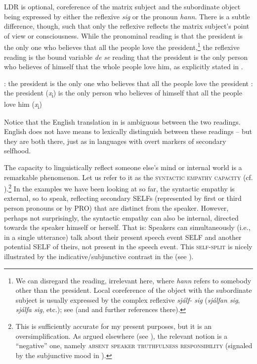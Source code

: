 \documentclass[output=paper]{LSP/langsci}
\begin{document}
LDR is optional, coreference of the matrix subject and the subordinate object being expressed by either the reflexive \textit{sig} or the pronoun \textit{hann}. There is a subtle difference, though, such that only the reflexive reflects the matrix subject’s point of view or consciousness. While the pronominal reading is that the president is the only one who believes that all the people love the president,\footnote{We can disregard the reading, irrelevant here, where \textit{hann} refers to somebody other than the president. Local coreference of the object with the subordinate subject is usually expressed by the complex reflexive \textit{sjálf- sig} (\textit{sjálfan sig}, \textit{sjálfa sig}, etc.); see \citealt[56]{Sigurjónsdóttir1992} (and \citealt[464]{Thráinsson2007} and further references there).} the reflexive reading is the bound variable \textit{de se} reading that the president is the only person who believes of himself that the whole people love him, as explicitly stated in .

\ea%
    \label{ex:Sigurdsson:18}
    : the president is the only one who believes that all the people
    love the president
: the president (\textit{x}\textsubscript{i}) is the only person who believes of himself that all the   people love him (\textit{x}\textsubscript{i})
\z
\z

Notice that the English translation in  is ambiguous between the two readings. English does not have means to lexically distinguish between these readings – but they are both there, just as in languages with overt markers of secondary selfhood.

The capacity to linguistically reflect someone else’s mind or internal world is a remarkable phenomenon. Let us refer to it as the \textsc{syntactic empathy capacity} (cf.  \citealt{KunoKaburaki1977}).\footnote{This is sufficiently accurate for my present purposes, but it is an oversimplification. As argued elsewhere (see \citealt[49]{Sigurðsson2010mood}), the relevant notion is a “negative” one, namely \textsc{absent speaker truthfulness responsibility} (signaled by the subjunctive mood in ).} In the examples we have been looking at so far, the syntactic empathy is external, so to speak, reflecting secondary SELFs (represented by first or third person pronouns or by PRO) that are distinct from the speaker. However, perhaps not surprisingly, the syntactic empathy can also be internal, directed towards the speaker himself or herself. That is: Speakers can simultaneously (i.e., in a single utterance) talk about their present speech event SELF and another potential SELF of theirs, not present in the speech event. This \textsc{self-split} is nicely illustrated by the indicative/subjunctive contrast in the   (see \citealt[325–326]{Sigurðsson1990}).
\end{document}
